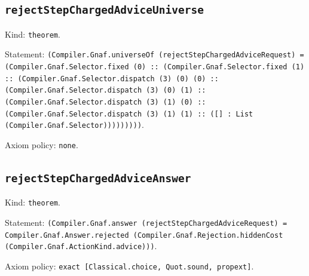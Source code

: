 \documentclass[11pt]{article}
\begin{document}
\subsection*{\texttt{rejectStepChargedAdviceUniverse}}
\noindent Kind: \texttt{theorem}.\par
\noindent Statement: \texttt{(Compiler.Gnaf.universeOf (rejectStepChargedAdviceRequest) = (Compiler.Gnaf.Selector.fixed (0) :: (Compiler.Gnaf.Selector.fixed (1) :: (Compiler.Gnaf.Selector.dispatch (3) (0) (0) :: (Compiler.Gnaf.Selector.dispatch (3) (0) (1) :: (Compiler.Gnaf.Selector.dispatch (3) (1) (0) :: (Compiler.Gnaf.Selector.dispatch (3) (1) (1) :: ([] : List (Compiler.Gnaf.Selector)))))))))}.\par
\noindent Axiom policy: \texttt{none}.\par
\subsection*{\texttt{rejectStepChargedAdviceAnswer}}
\noindent Kind: \texttt{theorem}.\par
\noindent Statement: \texttt{(Compiler.Gnaf.answer (rejectStepChargedAdviceRequest) = Compiler.Gnaf.Answer.rejected (Compiler.Gnaf.Rejection.hiddenCost (Compiler.Gnaf.ActionKind.advice)))}.\par
\noindent Axiom policy: \texttt{exact [Classical.choice, Quot.sound, propext]}.\par
\end{document}
